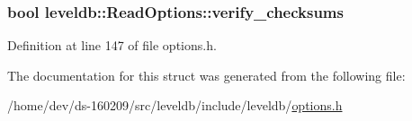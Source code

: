 \subsubsection[{verify\+\_\+checksums}]{\setlength{\rightskip}{0pt plus 5cm}bool leveldb\+::\+Read\+Options\+::verify\+\_\+checksums}\label{structleveldb_1_1_read_options_a43731d67b707995e20571ad33c1f53f2}


Definition at line 147 of file options.\+h.



The documentation for this struct was generated from the following file\+:\begin{DoxyCompactItemize}
\item 
/home/dev/ds-\/160209/src/leveldb/include/leveldb/\hyperlink{options_8h}{options.\+h}\end{DoxyCompactItemize}
